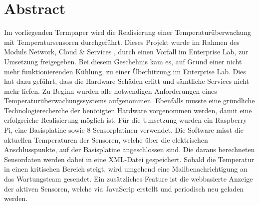 \section*{Abstract}
Im vorliegenden Termpaper wird die Realisierung einer Temperaturüberwachung mit Temperatursensoren durchgeführt. Dieses Projekt  wurde im Rahmen des Moduls \grqq{}Network, Cloud \& Services\glqq{} , durch einen Vorfall im Enterprise Lab, zur Umsetzung freigegeben. Bei diesem Geschehnis kam es, auf Grund einer nicht mehr funktionierenden Kühlung, zu einer Überhitzung im Enterprise Lab. Dies hat dazu geführt, dass die Hardware Schäden erlitt und sämtliche Services nicht mehr liefen.
Zu Beginn wurden alle notwendigen Anforderungen eines Temperaturüberwachungssystems aufgenommen. Ebenfalls musste eine gründliche Technologierecherche der benötigten Hardware vorgenommen werden, damit eine erfolgreiche Realisierung möglich ist.
Für die Umsetzung wurden ein Raspberry Pi, eine Basisplatine sowie 8 Sensorplatinen verwendet. Die Software misst die aktuellen Temperaturen der Sensoren, welche über die elektrischen Anschlusspunkte, auf der Basisplatine angeschlossen sind. Die daraus berechneten Sensordaten werden dabei in eine XML-Datei gespeichert. Sobald die Temperatur in einen kritischen Bereich steigt, wird umgehend eine Mailbenachrichtigung an das Wartungsteam gesendet. Ein zusätzliches Feature ist die webbasierte Anzeige der aktiven Sensoren, welche via JavaScrip erstellt und periodisch neu geladen werden.
 
\clearpage